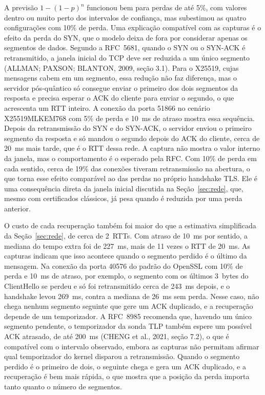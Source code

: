\documentclass[12pt,a4paper]{article}
\begin{document}
A previsão $1-(1-p)^n$ funcionou bem para perdas de até 5\%, com valores
dentro ou muito perto dos intervalos de confiança, mas subestimou as quatro
configurações com 10\% de perda. Uma explicação compatível com as capturas é o efeito da perda
do SYN, que o modelo deixa de fora por considerar apenas os segmentos de
dados. Segundo a RFC~5681, quando o SYN ou o SYN-ACK é retransmitido, a
janela inicial do TCP deve ser reduzida a um único segmento (ALLMAN; PAXSON;
BLANTON, 2009, seção 3.1). Para o X25519, cujas mensagens cabem em um
segmento, essa redução não faz diferença, mas o servidor pós-quântico só
consegue enviar o primeiro dos dois segmentos da resposta e precisa esperar
o ACK do cliente para enviar o segundo, o que acrescenta um RTT inteiro. A
conexão da porta 51866 no cenário X25519MLKEM768 com 5\% de perda e 10~ms de
atraso mostra essa sequência. Depois da retransmissão do SYN e do SYN-ACK, o
servidor enviou o primeiro segmento da resposta e só mandou o segundo depois
do ACK do cliente, cerca de 20~ms mais tarde, que é o RTT dessa rede. A
captura não mostra o valor interno da janela, mas o comportamento é o
esperado pela RFC. Com 10\% de perda em cada sentido, cerca de 19\% das
conexões tiveram retransmissão na abertura, o que torna esse efeito
comparável ao das perdas no próprio handshake TLS. Ele é uma consequência
direta da janela inicial discutida na Seção~\ref{sec:rede}, que, mesmo com
certificados clássicos, já pesa quando é reduzida por uma perda anterior.

O custo de cada recuperação também foi maior do que a estimativa
simplificada da Seção~\ref{sec:rede}, de cerca de 2~RTTs. Com atraso de
10~ms por sentido, a mediana do tempo extra foi de 227~ms, mais de 11 vezes
o RTT de 20~ms. As capturas indicam que isso acontece quando o segmento
perdido é o último da mensagem. Na conexão da porta 40576 do padrão do
OpenSSL com 10\% de perda e 10~ms de atraso, por exemplo, o segmento com os
últimos 3~bytes do ClientHello se perdeu e só foi retransmitido cerca de
243~ms depois, e o handshake levou 269~ms, contra a mediana de 26~ms sem
perda. Nesse caso, não chega nenhum segmento seguinte que gere um ACK
duplicado, e a recuperação depende de um temporizador. A RFC~8985 recomenda
que, havendo um único segmento pendente, o temporizador da sonda TLP
também espere um possível ACK atrasado, de até 200~ms (CHENG et al., 2021,
seção 7.2), o que é compatível com o intervalo observado, embora as
capturas não permitam afirmar qual temporizador do kernel disparou a
retransmissão. Quando o segmento perdido é o primeiro de dois, o seguinte
chega e gera um ACK duplicado, e a recuperação é bem mais rápida, o que
mostra que a posição da perda importa tanto quanto o número de segmentos.
\end{document}
